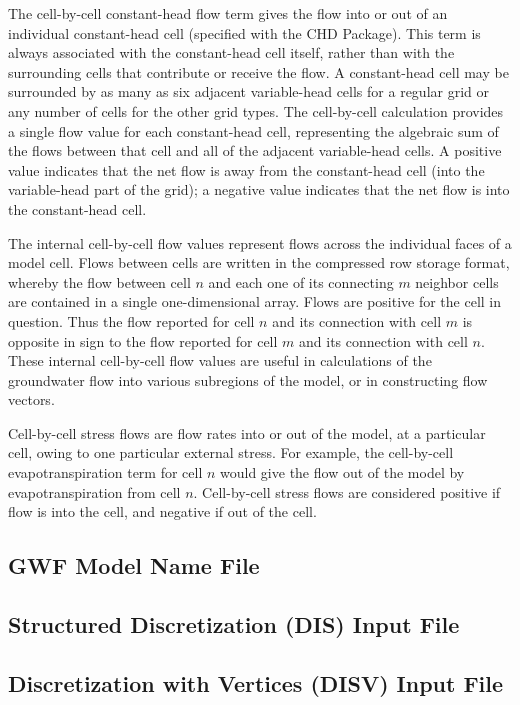The cell-by-cell constant-head flow term gives the flow into or out of an individual constant-head cell (specified with the CHD Package).  This term is always associated with the constant-head cell itself, rather than with the surrounding cells that contribute or receive the flow.  A constant-head cell may be surrounded by as many as six adjacent variable-head cells for a regular grid or any number of cells for the other grid types.  The cell-by-cell calculation provides a single flow value for each constant-head cell, representing the algebraic sum of the flows between that cell and all of the adjacent variable-head cells.  A positive value indicates that the net flow is away from the constant-head cell (into the variable-head part of the grid); a negative value indicates that the net flow is into the constant-head cell.

The internal cell-by-cell flow values represent flows across the individual faces of a model cell.  Flows between cells are written in the compressed row storage format, whereby the flow between cell $n$ and each one of its connecting $m$ neighbor cells are contained in a single one-dimensional array.  Flows are positive for the cell in question.  Thus the flow reported for cell $n$ and its connection with cell $m$ is opposite in sign to the flow reported for cell $m$ and its connection with cell $n$.  These internal cell-by-cell flow values are useful in calculations of the groundwater flow into various subregions of the model, or in constructing flow vectors.

Cell-by-cell stress flows are flow rates into or out of the model, at a particular cell, owing to one particular external stress.  For example, the cell-by-cell evapotranspiration term for cell $n$ would give the flow out of the model by evapotranspiration from cell $n$.  Cell-by-cell stress flows are considered positive if flow is into the cell, and negative if out of the cell.

\newpage
\subsection{GWF Model Name File}


\newpage
\subsection{Structured Discretization (DIS) Input File}


\newpage
\subsection{Discretization with Vertices (DISV) Input File}


